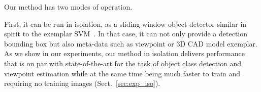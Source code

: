 % 
% 
% 
% 
% 
% 


Our method has two modes of operation.

First, it can be run in isolation, as a sliding window object
detector similar in spirit to the exemplar SVM~\cite{Malisiewicz11}. In
that case, it can not only provide a detection bounding box but also
meta-data such as viewpoint or 3D CAD model exemplar.
As we show in our experiments, our method in isolation delivers
performance that is on par with state-of-the-art for the task of
object class detection and viewpoint estimation while at the same time
being much faster to train and requiring no training images (Sect.~\ref{sec:exp_iso}).


